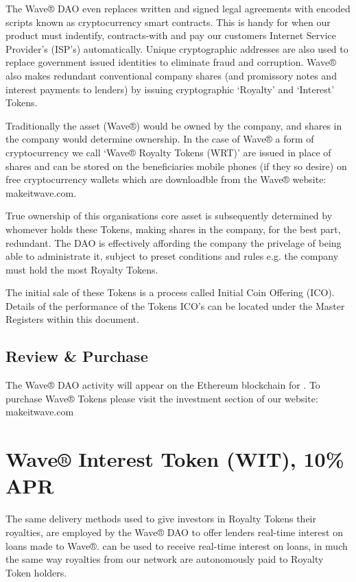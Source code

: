 \documentclass[letterpaper,10pt,openany,oneside,english]{sphinxmanual}
\begin{document}
The Wave® DAO even replaces written and signed legal agreements with encoded scripts known as cryptocurrency smart contracts.
This is handy for when our product must indentify, contracts-with and pay our customers Internet Service Provider’s (ISP’s) automatically.
Unique cryptographic addresses are also used to replace government issued identities to eliminate fraud and corruption.
Wave® also makes redundant conventional company shares (and promissory notes and interest payments to lenders) by issuing cryptographic ‘Royalty’ and ‘Interest’ Tokens.

Traditionally the asset (Wave®) would be owned by the company, and shares in the company would determine ownership.
In the case of Wave® a form of cryptocurrency we call ‘Wave® Royalty Tokens (WRT)’ are issued in place of shares and can be stored on the beneficiaries mobile phones (if they so desire) on free cryptocurrency wallets which are downloadble from the Wave®  website: makeitwave.com.

True ownership of this organisations core asset is subsequently determined by whomever holds these Tokens, making shares in the company, for the best part, redundant.
The DAO is effectively affording the company the privelage of being able to administrate it, subject to preset conditions and rules e.g. the company must hold the most Royalty Tokens.

The initial sale of these Tokens is a process called Initial Coin Offering (ICO).
Details of the performance of the Tokens ICO’s can be located under the Master Registers within this document.


\section{Review \& Purchase}
\label{\detokenize{introduction:review-purchase}}
The Wave® DAO activity will appear on the Ethereum blockchain for .
To purchase Wave® Tokens please visit the investment section of our website: makeitwave.com


\chapter{Wave® Interest Token (WIT), 10\% APR}
\label{\detokenize{wit-summary:wave-interest-token-wit-10-apr}}\label{\detokenize{wit-summary::doc}}
The same delivery methods used to give investors in Royalty Tokens their royalties, are employed by the Wave® DAO to offer lenders real-time interest on loans made to Wave®.
 can be used to receive real-time interest on loans, in much the same way royalties from our network are autonomously paid to Royalty Token holders.
\end{document}
